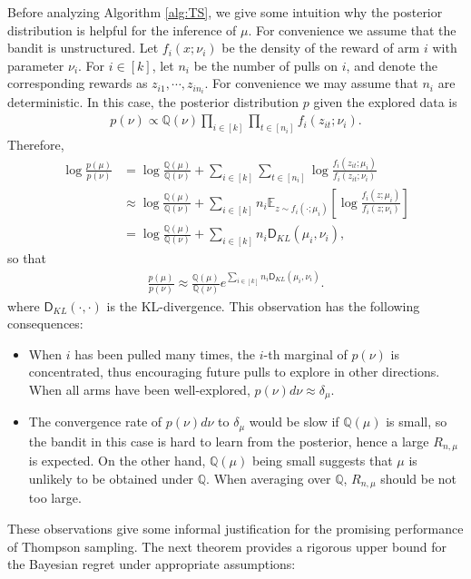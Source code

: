\documentclass[10pt, openright]{book}
\numberwithin{equation}{section}
\theoremstyle{plain}
\theoremstyle{definition}
\def\Q{{\mathbb Q}}
\def\E{{\mathbb E}}
\begin{document}
Before analyzing Algorithm \ref{alg:TS}, we give some intuition why the posterior distribution is helpful for the inference of $\mu$. For convenience we assume that the bandit is unstructured. Let $f_i(x;\nu_i)$ be the density of the reward of arm $i$ with parameter $\nu_i$. For $i\in [k]$, let $n_i$ be the number of pulls on $i$, and denote the corresponding rewards as $z_{i1}, \cdots, z_{in_i}$. For convenience we may assume that $n_i$ are deterministic. In this case, the posterior distribution $p$ given the explored data is
\begin{align*}
p(\nu)\propto\Q(\nu)\prod_{i\in [k]}\prod_{t\in [n_i]}f_i(z_{it};\nu_i).
\end{align*}
Therefore, 
\begin{align*}
\log\frac{p(\mu)}{p(\nu)} &= \log\frac{\Q(\mu)}{\Q(\nu)}+\sum_{i\in [k]}\sum_{t\in [n_i]}\log\frac{f_i(z_{it};\mu_i)}{f_i(z_{it};\nu_i)}\\
& \approx \log\frac{\Q(\mu)}{\Q(\nu)}+\sum_{i\in [k]}n_i\E_{z\sim f_i(\cdot; \mu_i)}\left[\log\frac{f_i(z;\mu_i)}{f_i(z;\nu_i)}\right]\\
& =  \log\frac{\Q(\mu)}{\Q(\nu)}+\sum_{i\in [k]}n_i\mathsf D_{KL}(\mu_i, \nu_i),
\end{align*}
so that
\begin{align*}
\frac{p(\mu)}{p(\nu)} \approx \frac{\Q(\mu)}{\Q(\nu)}e^{\sum_{i\in [k]}n_i\mathsf D_{KL}(\mu_i, \nu_i)}.
\end{align*}
where $\mathsf D_{KL}(\cdot, \cdot)$ is the KL-divergence. This observation has the following consequences:
\begin{itemize}
\item When $i$ has been pulled many times, the $i$-th marginal of $p(\nu)$ is concentrated, thus encouraging future pulls to explore in other directions. When all arms have been well-explored, $p(\nu)d\nu\approx\delta_{\mu}$.

\item The convergence rate of $p(\nu)d\nu$ to $\delta_{\mu}$ would be slow if $\Q(\mu)$ is small, so the bandit in this case is hard to learn from the posterior, hence a large $R_{n,\mu}$ is expected. On the other hand, $\Q(\mu)$ being small suggests that $\mu$ is unlikely to be obtained under $\Q$. When averaging over $\Q$, $R_{n,\mu}$ should be not too large. 
\end{itemize}

These observations give some informal justification for the promising performance of Thompson sampling. The next theorem provides a rigorous upper bound for the Bayesian regret under appropriate assumptions:
\end{document}
